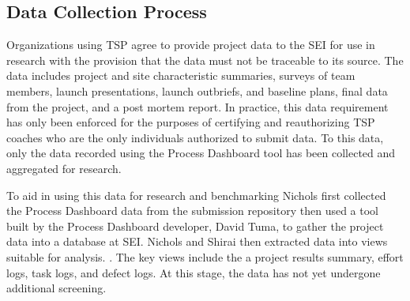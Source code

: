   
  

\subsection{Data Collection Process}


Organizations using TSP agree to provide project data to the SEI for use in research with the provision that the data must not be traceable to its source. The data includes project and site  characteristic summaries, surveys of team members, launch presentations, launch outbriefs, and baseline plans, final data from the project, and a post mortem report.  In practice, this data requirement has only been enforced for the purposes of certifying and reauthorizing TSP coaches who are the only individuals authorized to submit data. To this data, only the data recorded using the Process Dashboard tool has been collected and aggregated for research. 

To aid in using this data for research and benchmarking  Nichols first collected the Process Dashboard data from the submission repository then used a tool built by the Process Dashboard developer, David Tuma, 
to gather the project data into a database at SEI. Nichols and Shirai then extracted data into views suitable for analysis. . The key views include the a project results summary, effort logs, task logs, and defect logs. At this stage, the data has not yet undergone additional screening. 


